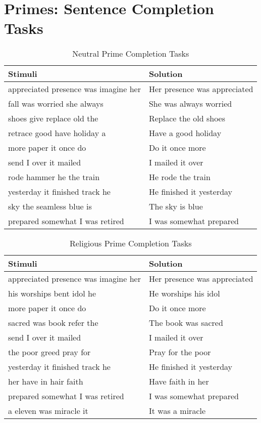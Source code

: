 \documentclass[12pt, titlepage]{article}
\title{\tb{May God's Grace Guide Me \\ {\large Supplemental Materials} }}
\author{Jennifer Lin}
\affil{Advanced Statistics for Psychology}
\newcommand\tb{\textbf}
\begin{document}
	
\begin{singlespace}
\maketitle
\end{singlespace}

\section*{Primes: Sentence Completion Tasks}

\begin{table}[H]
	\centering
	\caption{Neutral Prime Completion Tasks}\label{neutral}
	\begin{tabular}{ll}
		\hline
		\tb{Stimuli}&\tb{Solution}\\
		\hline
		appreciated presence was imagine her&Her presence was appreciated\\
		fall was worried she always&She was always worried\\
		shoes give replace old the&Replace the old shoes\\
		retrace good have holiday a&Have a good holiday\\
		more paper it once do&Do it once more\\
		send I over it mailed&I mailed it over\\
		rode hammer he the train&He rode the train\\
		yesterday it finished track he&He finished it yesterday\\
		sky the seamless blue is&The sky is blue\\
		prepared somewhat I was retired&I was somewhat prepared\\
		\hline
	\end{tabular}
\end{table}

\begin{table}[H]
	\centering
	\caption{Religious Prime Completion Tasks}\label{religious}
	\begin{tabular}{ll}
			\hline
		\tb{Stimuli}&\tb{Solution}\\
		\hline
		appreciated presence was imagine her&Her presence was appreciated\\
		his worships bent idol he&He worships his idol\\
		more paper it once do&Do it once more\\
		sacred was book refer the&The book was sacred\\
		send I over it mailed&I mailed it over\\
		the poor greed pray for&Pray for the poor\\
		yesterday it finished track he&He finished it yesterday\\
		her have in hair faith&Have faith in her\\
		prepared somewhat I was retired&I was somewhat prepared\\
		a eleven was miracle it&It was a miracle\\
		\hline
	\end{tabular}
\end{table}
\end{document}
